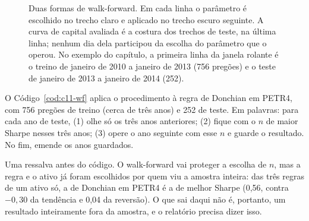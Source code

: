 \begin{figure}[t]
\centering
{}
\caption{Duas formas de walk-forward. Em cada linha o parâmetro é escolhido no trecho claro e aplicado no trecho escuro seguinte. A curva de capital avaliada é a costura dos trechos de teste, na última linha; nenhum dia dela participou da escolha do parâmetro que o operou. No exemplo do capítulo, a primeira linha da janela rolante é o treino de janeiro de 2010 a janeiro de 2013 (756 pregões) e o teste de janeiro de 2013 a janeiro de 2014 (252).}
\label{fig:c11-janelas}
\end{figure}

O Código~\ref{cod:c11-wf} aplica o procedimento à regra de Donchian em PETR4, com 756 pregões de treino (cerca de três anos) e 252 de teste. Em palavras: para cada ano de teste, (1) olhe só os três anos anteriores; (2) fique com o $n$ de maior Sharpe nesses três anos; (3) opere o ano seguinte com esse $n$ e guarde o resultado. No fim, emende os anos guardados.

Uma ressalva antes do código. O walk-forward vai proteger a escolha de $n$, mas a regra e o ativo já foram escolhidos por quem viu a amostra inteira: das três regras de um ativo só, a de Donchian em PETR4 é a de melhor Sharpe (0,56, contra $-0,30$ da tendência e 0,04 da reversão). O que sai daqui não é, portanto, um resultado inteiramente fora da amostra, e o relatório precisa dizer isso.

